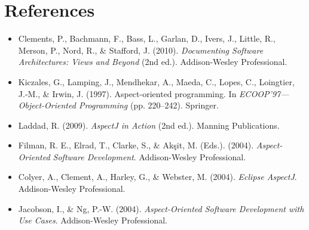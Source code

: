 \documentclass[11pt]{article}
\begin{document}
\section*{References}

\begin{itemize}
  \item Clements, P., Bachmann, F., Bass, L., Garlan, D., Ivers, J., Little, R., Merson, P., Nord, R., \& Stafford, J. (2010). \textit{Documenting Software Architectures: Views and Beyond} (2nd ed.). Addison-Wesley Professional.
  \item Kiczales, G., Lamping, J., Mendhekar, A., Maeda, C., Lopes, C., Loingtier, J.-M., \& Irwin, J. (1997). Aspect-oriented programming. In \textit{ECOOP'97---Object-Oriented Programming} (pp. 220--242). Springer.
  \item Laddad, R. (2009). \textit{AspectJ in Action} (2nd ed.). Manning Publications.
  \item Filman, R. E., Elrad, T., Clarke, S., \& Ak\c{s}it, M. (Eds.). (2004). \textit{Aspect-Oriented Software Development}. Addison-Wesley Professional.
  \item Colyer, A., Clement, A., Harley, G., \& Webster, M. (2004). \textit{Eclipse AspectJ}. Addison-Wesley Professional.
  \item Jacobson, I., \& Ng, P.-W. (2004). \textit{Aspect-Oriented Software Development with Use Cases}. Addison-Wesley Professional.
\end{itemize}

\listoffigures
\end{document}
